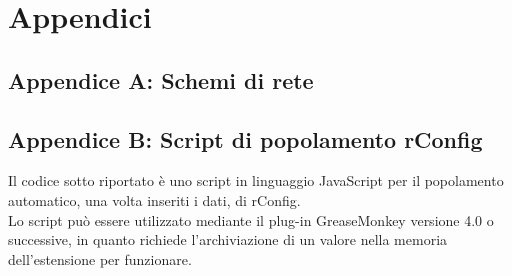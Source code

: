 \documentclass[Tesi.tex]{subfiles}
\begin{document}
\chapter*{Appendici}
\label{sec:Appendice A}
\section*{Appendice A: Schemi di rete}


\label{sec:Appendice B}
\section*{Appendice B: Script di popolamento rConfig}
Il codice sotto riportato è uno script in linguaggio JavaScript per il popolamento automatico, una volta inseriti i dati, di rConfig. \\
Lo script può essere utilizzato mediante il plug-in GreaseMonkey versione 4.0 o successive, in quanto richiede l'archiviazione di un valore nella memoria dell'estensione per funzionare. \\
\end{document}
